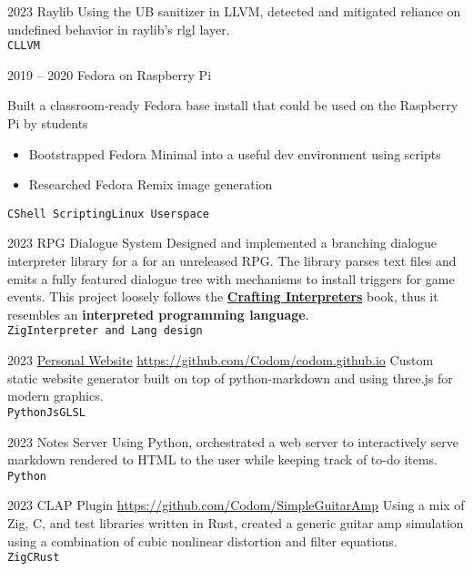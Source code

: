 \documentclass[9pt]{developercv} %
\begin{document}

\begin{entrylist}
	\entry
	{2023}
	{Raylib}
    {}
    {
        Using the UB sanitizer in LLVM, detected and mitigated reliance on undefined behavior in raylib's
        rlgl layer.
	    \\
	    \texttt{C}\slashsep\texttt{LLVM}
    }

	\entry
		{2019 -- 2020}
		{Fedora on Raspberry Pi}
        {}
        {
	Built a classroom-ready Fedora base install that could be used on the Raspberry Pi by students
	\begin{itemize}\itemsep=0em
		\item Bootstrapped Fedora Minimal into a useful dev environment using scripts
		\item Researched Fedora Remix image generation
	\end{itemize}
	\texttt{C}\slashsep\texttt{Shell Scripting}\slashsep\texttt{Linux Userspace}}

\end{entrylist}


\begin{entrylist}
	\entry
	{2023}
	{RPG Dialogue System}
    {}
	{
		Designed and implemented a branching dialogue interpreter library for a
		for an unreleased RPG. The library parses
		text files and emits a fully featured dialogue tree with mechanisms
		to install triggers for game events. This project
		loosely follows the
		{\bf\href{https://craftinginterpreters.com/}{Crafting Interpreters}}
		book, thus it resembles an {\bf interpreted programming language}.
		\\
		\texttt{Zig}\slashsep\texttt{Interpreter and Lang design}
	}

	\entry
	{2023}
	{\href{https://chrisodom.org/}{Personal Website}}
    {\href{https://github.com/Codom/codom.github.io}{https://github.com/Codom/codom.github.io}}
    {
        Custom static website generator built on top of python-markdown and using three.js for modern
	    graphics.
	    \\
	    \texttt{Python}\slashsep\texttt{Js}\slashsep\texttt{GLSL}
    }

	\entry
	{2023}
	{Notes Server}
    {}
    {
        Using Python, orchestrated a web server to interactively serve markdown rendered to
        HTML to the user while keeping track of to-do items.
	    \\
	    \texttt{Python}
    }

	\entry
	{2023}
    {CLAP Plugin}
    {\href{https://github.com/Codom/SimpleGuitarAmp}{https://github.com/Codom/SimpleGuitarAmp}}
    {
        Using a mix of Zig, C, and test libraries written in Rust, created a generic guitar
        amp simulation using a combination of cubic nonlinear distortion and filter equations.
        \\
        \texttt{Zig}\slashsep\texttt{C}\slashsep\texttt{Rust}
    }

\end{entrylist}
\end{document}
